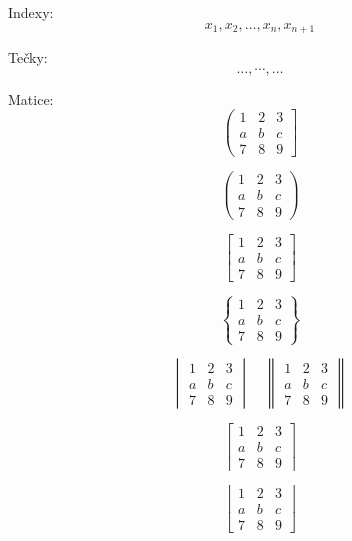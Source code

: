 \documentclass[a4paper, 12pt]{article}
\begin{document}
Indexy:
$$ x_1, x_2, \dots, x_n, x_{n+1} $$

Tečky:
$$ \dots, \cdots, \ldots $$

Matice:
$$
    \left(
    \begin{matrix}
        1 & 2 & 3 \\
        a & b & c \\
        7 & 8 & 9
    \end{matrix}
    \right]
$$

$$
    \begin{pmatrix}
        1 & 2 & 3 \\
        a & b & c \\
        7 & 8 & 9
    \end{pmatrix}
$$

$$
    \begin{bmatrix}
        1 & 2 & 3 \\
        a & b & c \\
        7 & 8 & 9
    \end{bmatrix}
$$

$$
    \begin{Bmatrix}
        1 & 2 & 3 \\
        a & b & c \\
        7 & 8 & 9
    \end{Bmatrix}
$$

$$
    \begin{vmatrix}
        1 & 2 & 3 \\
        a & b & c \\
        7 & 8 & 9
    \end{vmatrix}
    \quad %
    \begin{Vmatrix}
        1 & 2 & 3 \\
        a & b & c \\
        7 & 8 & 9
    \end{Vmatrix}
$$

$$
    \left \lceil
    \begin{matrix}
        1 & 2 & 3 \\
        a & b & c \\
        7 & 8 & 9
    \end{matrix}
    \right \rceil
$$

$$
    \left \lfloor
    \begin{matrix}
        1 & 2 & 3 \\
        a & b & c \\
        7 & 8 & 9
    \end{matrix}
    \right \rfloor
$$
\end{document}
